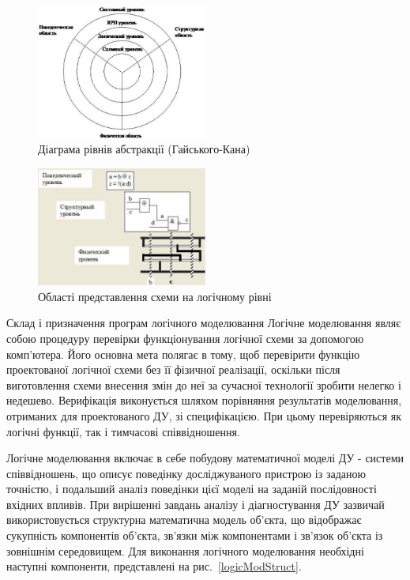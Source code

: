 \documentclass[12pt,a4paper]{article}
\begin{document}
\begin{figure}[h]
  \centering
    \includegraphics[width=0.5\textwidth]{01_01.jpg}
  \caption{Діаграма рівнів абстракції (Гайського-Кана)\label{abstrLvlDiag}}
\end{figure}

\begin{figure}[h]
  \centering
    \includegraphics[width=0.5\textwidth]{01_02.jpg}
  \caption{Області представлення схеми на логічному рівні\label{logicLvl}}
\end{figure}



Склад і призначення програм логічного моделювання
Логічне моделювання являє собою процедуру перевірки функціонування логічної схеми за допомогою комп'ютера. Його основна мета полягає в тому, щоб перевірити функцію проектованої логічної схеми без її фізичної реалізації, оскільки після виготовлення схеми внесення змін до неї за сучасної технології зробити нелегко і недешево. Верифікація виконується шляхом порівняння результатів моделювання, отриманих для проектованого ДУ, зі специфікацією. При цьому перевіряються як логічні функції, так і тимчасові співвідношення.

Логічне моделювання включає в себе побудову математичної моделі ДУ - системи співвідношень, що описує поведінку досліджуваного пристрою із заданою точністю, і подальший аналіз поведінки цієї моделі на заданій послідовності вхідних впливів. При вирішенні завдань аналізу і діагностування ДУ зазвичай використовується структурна математична модель об'єкта, що відображає сукупність компонентів об'єкта, зв'язки між компонентами і зв'язок об'єкта із зовнішнім середовищем. Для виконання логічного моделювання необхідні наступні компоненти, представлені на рис.~\ref{logicModStruct}.
\end{document}
